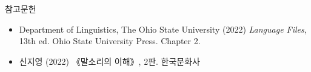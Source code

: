 \documentclass[11pt, aspectratio=169]{beamer}
\newcommand{\texttnr}[1]{{\tnrfont #1}}
\begin{document}
\begin{frame}[t]{참고문헌}
  \begin{itemize}
    \item \texttnr{Department of Linguistics, The Ohio State University (2022) \textit{Language Files}, 13th ed. Ohio State University Press. Chapter 2.}
    \item 신지영 (2022) 《말소리의 이해》, 2판. 한국문화사
  \end{itemize}
    
\end{frame}
\end{document}
